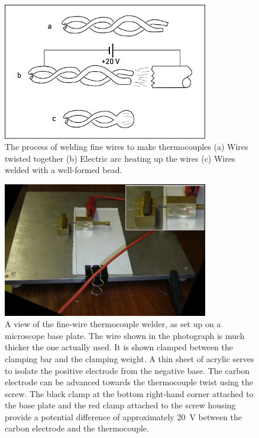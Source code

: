 \begin{figure}
	\centering
	\includegraphics[width=0.8\textwidth]{Figures/TCWelding}
	\decoRule

\caption[Welding process schematic]{The process of welding fine wires to make
thermocouples (a) Wires twisted together (b) Electric arc heating up the wires
(c) Wires welded with a well-formed bead. }

\label{fig:WeldingSteps}
\end{figure}


\begin{figure}
	\centering
	\includegraphics[width=0.8\textwidth]{Figures/Welder3.jpg}
	\decoRule

\caption[Fine-wire welder]{A view of the fine-wire thermocouple welder, as set
up on a microscope base plate. The wire shown in the photograph is much thicker
the one actually used. It is shown clamped between the clamping bar and the
clamping weight. A thin sheet of acrylic serves to isolate the positive
electrode from the negative base. The carbon electrode can be advanced towards
the thermocouple twist using the screw. The black clamp at the bottom right-hand
corner attached to the base plate and the red clamp attached to the screw
housing provide a potential difference of approximately \SI{20}{V} between the
carbon electrode and the thermocouple. }

\label{fig:FineWireWelder}
\end{figure}

